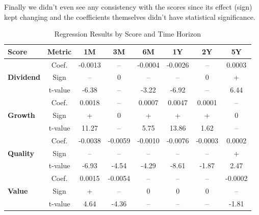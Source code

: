 \documentclass[11pt,english,a4paper,hidelinks]{book}
\begin{document}
\vspace{0.5cm}
\noindent Finally we didn't even see any consistency with the scores since its effect (sign) kept changing and the coefficients themselves didn't have statistical significance.

\begin{table}[H]
    \centering
    \caption{Regression Results by Score and Time Horizon}
    \begin{tabular}{lccccccc}
        \toprule
        \textbf{Score} & \textbf{Metric} & \textbf{1M} & \textbf{3M} & \textbf{6M} & \textbf{1Y} & \textbf{2Y} & \textbf{5Y} \\
        \midrule
        \multirow{3}{*}{\textbf{Dividend}} 
            & Coef.   & -0.0013 & --      & -0.0004 & -0.0026 & --      & 0.0003 \\
            & Sign    & --      & 0       & --      & --      & 0       & +      \\
            & t-value & -6.38   & --      & -3.22   & -6.92   & --      & 6.44   \\
        \midrule
        \multirow{3}{*}{\textbf{Growth}} 
            & Coef.   & 0.0018  & --      & 0.0007  & 0.0047  & 0.0001  & --     \\
            & Sign    & +       & 0       & +       & +       & +       & 0      \\
            & t-value & 11.27   & --      & 5.75    & 13.86   & 1.62    & --     \\
        \midrule
        \multirow{3}{*}{\textbf{Quality}} 
            & Coef.   & -0.0038 & -0.0059 & -0.0010 & -0.0076 & -0.0003 & 0.0002 \\
            & Sign    & --      & --      & --      & --      & --      & +      \\
            & t-value & -6.93   & -4.54   & -4.29   & -8.61   & -1.87   & 2.47   \\
        \midrule
        \multirow{3}{*}{\textbf{Value}} 
            & Coef.   & 0.0015  & -0.0054 & --      & --      & --      & -0.0002 \\
            & Sign    & +       & --      & 0       & 0       & 0       & --      \\
            & t-value & 4.64    & -4.36   & --      & --      & --      & -1.81   \\
        \bottomrule
    \end{tabular}
    \label{tab:regression_results_scores}
\end{table}
\end{document}
